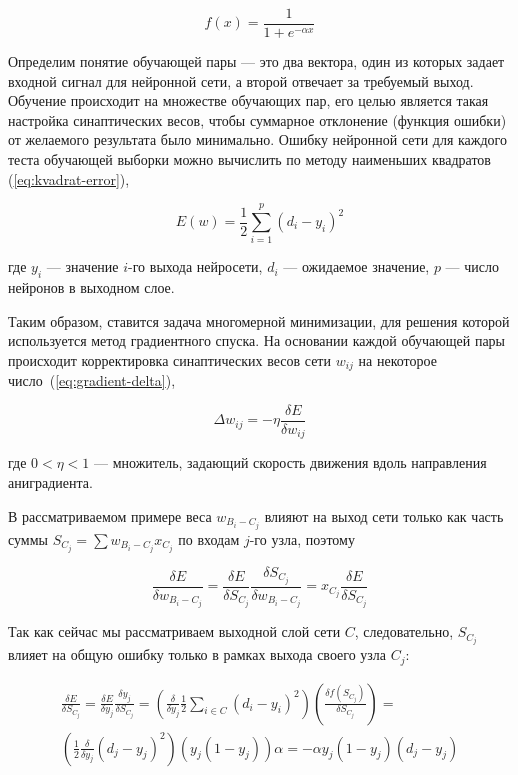 \documentclass[a4paper,14pt]{extarticle} %
\begin{document}
\begin{equation}\label{eq:sigmoid}
f(x)=\frac{1}{1+e^{-\alpha x}}
\end{equation}

Определим понятие обучающей пары --- это два вектора, один из которых задает входной сигнал для нейронной сети, а второй отвечает за требуемый выход. Обучение происходит на множестве обучающих пар, его целью является такая настройка синаптических весов, чтобы суммарное отклонение (функция ошибки) от желаемого результата было минимально. Ошибку нейронной сети для каждого теста обучающей выборки можно вычислить по методу наименьших квадратов (\ref{eq:kvadrat-error}),

\begin{equation}\label{eq:kvadrat-error}
E(w) = \frac{1}{2} \sum\limits_{i=1}^{p} (d_i-y_i)^2
\end{equation}

\noindent где $y_i$ --- значение $i$-го выхода нейросети, $d_i$ --- ожидаемое значение, $p$ --- число нейронов в выходном слое.

Таким образом, ставится задача многомерной минимизации, для решения которой используется метод градиентного спуска. На основании каждой обучающей пары происходит корректировка синаптических весов сети $w_{ij}$ на некоторое число~(\ref{eq:gradient-delta}),

\begin{equation}\label{eq:gradient-delta}
\Delta w_{ij}=-\eta \frac{\delta E}{\delta w_{ij}}
\end{equation}

\noindent где $0<\eta < 1$ --- множитель, задающий скорость движения вдоль направления аниградиента.

В рассматриваемом примере веса $w_{B_i-C_j}$ влияют на выход сети только как часть суммы $S_{C_j} = \sum w_{B_i-C_j} x_{C_j}$ по входам $j$-го узла, поэтому

$$
\frac{\delta E}{\delta w_{B_i-C_j}} = \frac{\delta E}{\delta S_{C_j}} \frac{\delta S_{C_j}}{\delta w_{B_i-C_j}} = x_{C_j} \frac{\delta E}{\delta S_{C_j}}
$$

Так как сейчас мы рассматриваем выходной слой сети $C$, следовательно, $S_{C_j}$ влияет на общую ошибку только в рамках выхода своего узла $C_j$:

\begin{eqnarray}\label{eq:out-layer-error}
\frac{\delta E}{\delta S_{C_j}} = \frac{\delta E}{\delta y_j} \frac{\delta y_j}{\delta  S_{C_j}} = \left(\frac{\delta}{\delta y_j} \frac{1}{2} \sum\limits_{i \in C} (d_i-y_i)^2\right)\left(\frac{\delta f(S_{C_j})}{\delta S_{C_j}}\right) = \nonumber \\ \left(\frac{1}{2}\frac{\delta}{\delta y_j}(d_j-y_j)^2\right)\left(y_j(1-y_j)\right)\alpha = -\alpha y_j(1-y_j)(d_j-y_j)
\end{eqnarray}
\end{document}

